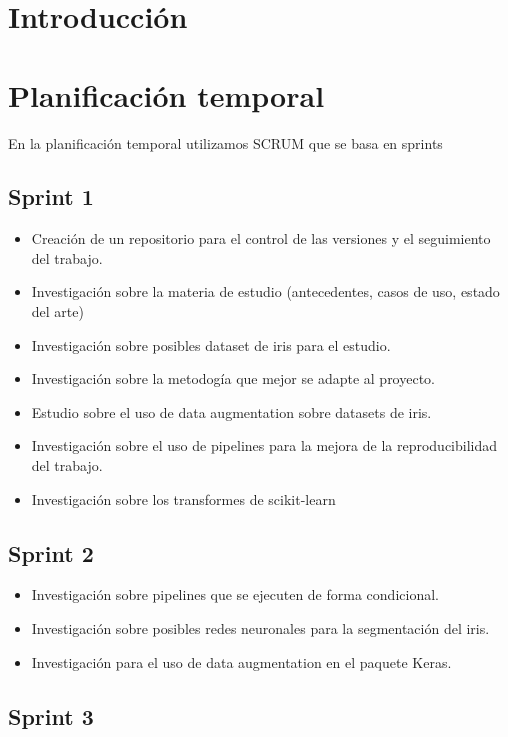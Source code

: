 
\section{Introducción}

\section{Planificación temporal}

En la planificación temporal utilizamos SCRUM que se basa en sprints

\subsection{Sprint 1}

\begin{itemize}
\item Creación de un repositorio para el control de las versiones y el seguimiento del trabajo.
\item Investigación sobre la materia de estudio (antecedentes, casos de uso, estado del arte)
\item Investigación sobre posibles dataset de iris para el estudio.
\item Investigación sobre la metodogía que mejor se adapte al proyecto.
\item Estudio sobre el uso de data augmentation sobre datasets de iris.
\item Investigación sobre el uso de pipelines para la mejora de la reproducibilidad del trabajo.
\item Investigación sobre los transformes de scikit-learn
\end{itemize}

\subsection{Sprint 2}

\begin{itemize}
\item Investigación sobre pipelines que se ejecuten de forma condicional.
\item Investigación sobre posibles redes neuronales para la segmentación del iris.
\item Investigación para el uso de data augmentation en el paquete Keras.
\end{itemize}

\subsection{Sprint 3}

